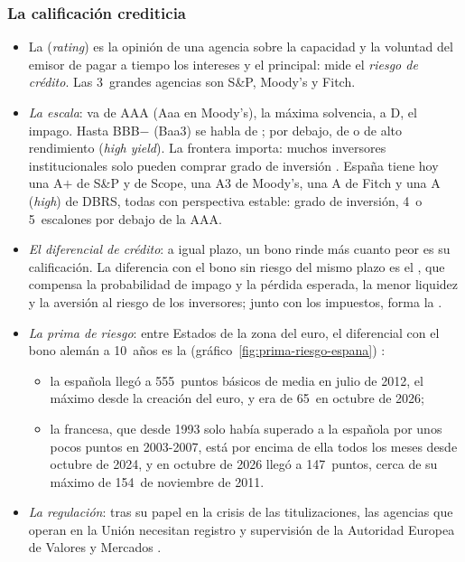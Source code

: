 \documentclass[11pt]{article}
\begin{document}
\subsubsection{La calificación crediticia}\label{sec:rating}

\begin{itemize}
\item La  (\emph{rating}) es la opinión de una agencia sobre la capacidad y la voluntad del emisor de pagar a tiempo los intereses y el principal: mide el \emph{riesgo de crédito}. Las 3~grandes agencias son S\&P, Moody's y Fitch.
\item \emph{La escala}: va de AAA (Aaa en Moody's), la máxima solvencia, a D, el impago. Hasta BBB$-$ (Baa3) se habla de ; por debajo, de  o de alto rendimiento (\emph{high yield}). La frontera importa: muchos inversores institucionales solo pueden comprar grado de inversión . España tiene hoy una A$+$ de S\&P y de Scope, una A3 de Moody's, una A de Fitch y una A (\emph{high}) de DBRS, todas con perspectiva estable\nocite{Tesoro2026Calificacion}: grado de inversión, 4~o 5~escalones por debajo de la AAA.
\item \emph{El diferencial de crédito}: a igual plazo, un bono rinde más cuanto peor es su calificación. La diferencia con el bono sin riesgo del mismo plazo es el , que compensa la probabilidad de impago y la pérdida esperada, la menor liquidez y la aversión al riesgo de los inversores; junto con los impuestos, forma la \nocite{MishkinEakins2018Financial}.
\item \emph{La prima de riesgo}: entre Estados de la zona del euro, el diferencial con el bono alemán a 10~años es la  (gráfico~\ref{fig:prima-riesgo-espana})\nocite{BCE2026IRS}  :
  \begin{itemize}
  \item la española llegó a 555~puntos básicos de media en julio de 2012, el máximo desde la creación del euro, y era de 65~en octubre de 2026\nocite{BCE2026IRS};
  \item la francesa, que desde 1993 solo había superado a la española por unos pocos puntos en 2003-2007, está por encima de ella todos los meses desde octubre de 2024, y en octubre de 2026 llegó a 147~puntos, cerca de su máximo de 154~de noviembre de 2011\nocite{BCE2026IRS}.
  \end{itemize}
\item \emph{La regulación}: tras su papel en la crisis de las titulizaciones, las agencias que operan en la Unión necesitan registro y supervisión de la Autoridad Europea de Valores y Mercados\nocite{UE2009Agencias}  .
\end{itemize}
\end{document}
